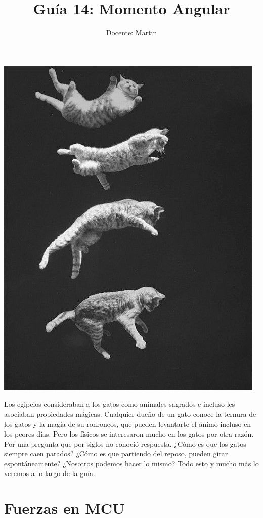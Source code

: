 \documentclass[letterpaper]{article}
\author{Docente: Martin}
\date{}
\title{\bf Guía 14: Momento Angular}
\newcounter{propiedades}
\begin{document}
\maketitle
\thispagestyle{fancy}
\begin{center}
\includegraphics[scale=0.6]{portada.jpg}
\end{center}
\pagebreak

Los egipcios consideraban a los gatos como animales sagrados e incluso les asociaban propiedades mágicas. Cualquier dueño de un gato conoce la ternura de los gatos y la magia de su ronroneos, que pueden levantarte el ánimo incluso en los peores días. Pero los físicos se interesaron mucho en los gatos por otra razón. Por una pregunta que por siglos no conoció respuesta. ¿Cómo es que los gatos siempre caen parados? ¿Cómo es que partiendo del reposo, pueden girar espontáneamente? ¿Nosotros podemos hacer lo mismo? Todo esto y mucho más lo veremos a lo largo de la guía.  

\section*{Fuerzas en MCU}
\end{document}
